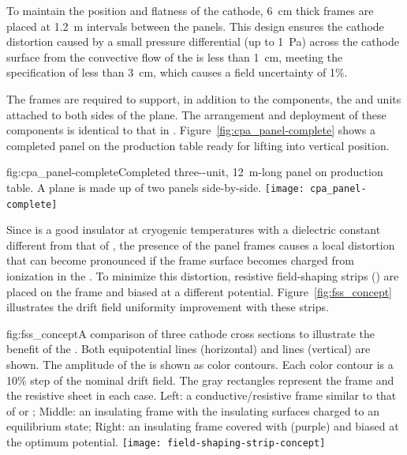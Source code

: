 To maintain the position and flatness of the cathode, 
\SI{6}{cm} thick \frfour frames are placed at \SI{1.2}{m} intervals between the  panels. This design ensures the cathode distortion caused by a small pressure differential (up to \SI{1}{Pa}) across the cathode surface from the convective flow of the  is less than \SI{1}{cm}, meeting the specification of less than \SI{3}{cm}, which causes a field uncertainty of 1\%.

The  frames are required to support, in addition to the  components, the  and  units attached to both sides of the  plane. The arrangement and deployment of these components is identical to that in .  Figure~\ref{fig:cpa_panel-complete} shows a completed   panel on the production table ready for lifting into vertical position. %

\begin{dunefigure}{fig:cpa_panel-complete}{Completed three--unit, \SI{12}{m}-long   panel  on production table. A  plane is made up of two panels side-by-side.}
\texttt{[image: cpa\_panel-complete]}
\end{dunefigure}

 Since \frfour is a good insulator at cryogenic temperatures with a dielectric constant different from that of , the presence of the  panel frames causes a local \efield distortion that can become pronounced if the frame surface becomes charged 
from ionization in the .  To minimize this distortion, resistive field-shaping strips () are placed on the frame and biased at a different potential.  Figure~\ref{fig:fss_concept} illustrates the drift field uniformity improvement with these strips.

\begin{dunefigure}{fig:fss_concept}{A comparison of three cathode cross sections to illustrate the benefit of the . Both equipotential lines (horizontal) and \efield{} lines (vertical) are shown.  The amplitude of the \efield{} is shown as color contours. Each color contour is a 10\% step of the nominal drift field.  The gray rectangles represent the frame and the resistive sheet in each case. Left: a conductive/resistive frame similar to that of  or ; Middle: an insulating frame with the insulating surfaces charged to an equilibrium state; Right: an insulating frame covered with  (purple) and biased at the optimum potential. }
\texttt{[image: field-shaping-strip-concept]} %
\end{dunefigure}

